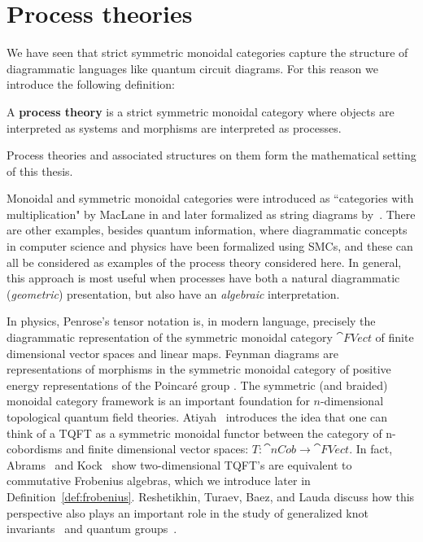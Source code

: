\section{Process theories}
\label{sec:PTs}

We have seen that strict symmetric monoidal categories capture the structure of  diagrammatic languages like quantum circuit diagrams. For this reason we introduce the following definition:

\begin{defn}
A \textbf{process theory} is a strict symmetric monoidal category where objects are interpreted as systems and morphisms are interpreted as processes.
\end{defn}

\noindent Process theories and associated structures on them form the mathematical setting of this thesis.

Monoidal and symmetric monoidal categories were introduced as ``categories with multiplication" by MacLane in \cite{maclane1963natural} and later formalized as string diagrams by~\cite{joyal1991geometry}. There are other examples, besides quantum information, where diagrammatic concepts in computer science and physics have been formalized using SMCs, and these can all be considered as examples of the process theory considered here.  In general, this approach is most useful when processes have both a natural diagrammatic (\emph{geometric}) presentation, but also have an \emph{algebraic} interpretation.

In physics, Penrose's tensor notation \cite{penrose1971applications} is, in modern language, precisely the diagrammatic representation of the symmetric monoidal category $\cat{FVect}$ of finite dimensional vector spaces and linear maps. Feynman diagrams are representations of morphisms in the symmetric monoidal category of positive energy representations of the Poincar\'{e} group \cite{baez2009prehistory}. The symmetric (and braided) monoidal category framework is an important foundation for $n$-dimensional topological quantum field theories. Atiyah~\cite{atiyah1988topological} introduces the idea that one can think of a TQFT as a symmetric monoidal functor between the category of n-cobordisms and finite dimensional vector spaces: $T:\cat{nCob}\to \cat{FVect}$. In fact, Abrams~\cite{abrams1996two} and Kock~\cite{kock2004frobenius} show two-dimensional TQFT's are equivalent to commutative Frobenius algebras, which we introduce later in Definition~\ref{def:frobenius}. Reshetikhin, Turaev, Baez, and Lauda discuss how this perspective also plays an important role in the study of generalized knot invariants~\cite{reshetikhin1990ribbon} and quantum groups~\cite{baez2009prehistory}. 


